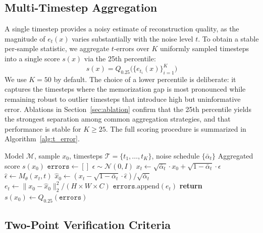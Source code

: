 \documentclass{article}
\begin{document}
\subsection{Multi-Timestep Aggregation}
\label{sec:aggregation}

A single timestep provides a noisy estimate of reconstruction quality, as the magnitude of $e_t(x)$ varies substantially with the noise level $t$. To obtain a stable per-sample statistic, we aggregate $t$-errors over $K$ uniformly sampled timesteps into a single score $s(x)$ via the 25th percentile:
\begin{equation}
  s(x) = Q_{0.25}\!\bigl(\{e_{t_i}(x)\}_{i=1}^{K}\bigr)
\end{equation}
We use $K{=}50$ by default. The choice of a lower percentile is deliberate: it captures the timesteps where the memorization gap is most pronounced while remaining robust to outlier timesteps that introduce high but uninformative error. Ablations in Section~\ref{sec:ablation} confirm that the 25th percentile yields the strongest separation among common aggregation strategies, and that performance is stable for $K \geq 25$. The full scoring procedure is summarized in Algorithm~\ref{alg:t_error}.

\begin{algorithm}[t]
\caption{$t$-error Computation}
\label{alg:t_error}
\begin{algorithmic}
\REQUIRE Model $\mathcal{M}$, sample $x_0$, timesteps $\mathcal{T} = \{t_1, \ldots, t_K\}$, noise schedule $\{\bar{\alpha}_t\}$
\ENSURE Aggregated score $s(x_0)$
\STATE $\texttt{errors} \leftarrow []$
    \STATE $\epsilon \sim \mathcal{N}(0, I)$
    \STATE $x_t \leftarrow \sqrt{\bar{\alpha}_t} \cdot x_0 + \sqrt{1 - \bar{\alpha}_t} \cdot \epsilon$
    \STATE $\hat{\epsilon} \leftarrow M_\theta(x_t, t)$
    \STATE $\hat{x}_0 \leftarrow (x_t - \sqrt{1 - \bar{\alpha}_t} \cdot \hat{\epsilon}) / \sqrt{\bar{\alpha}_t}$
    \STATE $e_t \leftarrow \|x_0 - \hat{x}_0\|_2^2 / (H \times W \times C)$
    \STATE $\texttt{errors}.\text{append}(e_t)$
\ENDFOR
\STATE \textbf{return} $s(x_0) \leftarrow Q_{0.25}(\texttt{errors})$
\end{algorithmic}
\end{algorithm}

\subsection{Two-Point Verification Criteria}
\label{sec:criteria}
\end{document}
